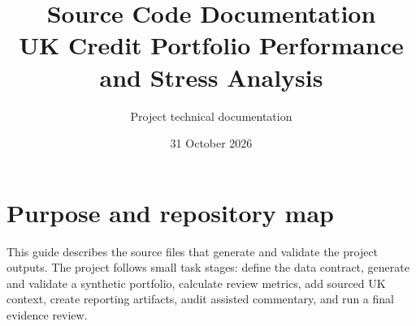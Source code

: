 \documentclass[11pt]{article}
\title{Source Code Documentation\\[4pt]\large UK Credit Portfolio Performance and Stress Analysis}
\author{Project technical documentation}
\date{31 October 2026}
\begin{document}
\maketitle
\syntheticnotice
\tableofcontents
\newpage

\section{Purpose and repository map}

This guide describes the source files that generate and validate the project outputs. The project follows small task stages: define the data contract, generate and validate a synthetic portfolio, calculate review metrics, add sourced UK context, create reporting artifacts, audit assisted commentary, and run a final evidence review.
\end{document}
